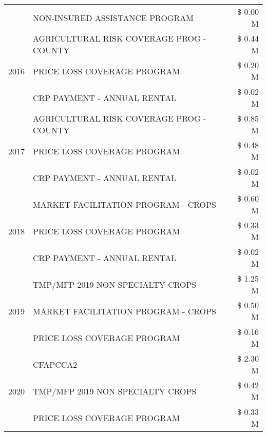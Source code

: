 \begin{tabular}{llr}
 & NON-INSURED ASSISTANCE PROGRAM & \$ 0.00 M \\
\cline{1-3}
\multirow[t]{3}{*}{2016} & AGRICULTURAL RISK COVERAGE PROG - COUNTY & \$ 0.44 M \\
 & PRICE LOSS COVERAGE PROGRAM & \$ 0.20 M \\
 & CRP PAYMENT - ANNUAL RENTAL & \$ 0.02 M \\
\cline{1-3}
\multirow[t]{3}{*}{2017} & AGRICULTURAL RISK COVERAGE PROG - COUNTY & \$ 0.85 M \\
 & PRICE LOSS COVERAGE PROGRAM & \$ 0.48 M \\
 & CRP PAYMENT - ANNUAL RENTAL & \$ 0.02 M \\
\cline{1-3}
\multirow[t]{3}{*}{2018} & MARKET FACILITATION PROGRAM - CROPS & \$ 0.60 M \\
 & PRICE LOSS COVERAGE PROGRAM & \$ 0.33 M \\
 & CRP PAYMENT - ANNUAL RENTAL & \$ 0.02 M \\
\cline{1-3}
\multirow[t]{3}{*}{2019} & TMP/MFP 2019 NON SPECIALTY CROPS & \$ 1.25 M \\
 & MARKET FACILITATION PROGRAM - CROPS & \$ 0.50 M \\
 & PRICE LOSS COVERAGE PROGRAM & \$ 0.16 M \\
\cline{1-3}
\multirow[t]{3}{*}{2020} & CFAPCCA2 & \$ 2.30 M \\
 & TMP/MFP 2019 NON SPECIALTY CROPS & \$ 0.42 M \\
 & PRICE LOSS COVERAGE PROGRAM & \$ 0.33 M \\
\cline{1-3}
\bottomrule
\end{tabular}
